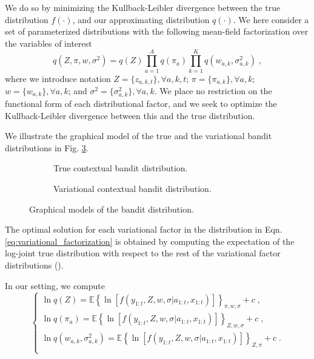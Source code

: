 \documentclass[10pt]{article}
\newcommand{\eValue}[1]{\mathbb{E}\left\{ #1 \right\}}
\begin{document}
We do so by minimizing the Kullback-Leibler divergence between the true distribution $f(\cdot)$, and our approximating distribution $q(\cdot)$. We 
here consider
a set of parameterized distributions with the following mean-field factorization over the variables of interest
\begin{equation}
q(Z, \pi, w, \sigma^2)=q(Z) \prod_{a=1}^A q(\pi_a) \prod_{k=1}^{K} q(w_{a,k}, \sigma_{a,k}^2) \; ,
\label{eq:variational_factorization}
\end{equation}
where we introduce notation 
  $Z=\{z_{a,k,t}\}, \forall a,k,t$; 
  $\pi=\{\pi_{a,k}\}, \forall a,k$; 
  $w=\{w_{a,k}\}, \forall a,k$; 
  and 
  $\sigma^2=\{\sigma_{a,k}^2\}, \forall a,k$. 
We place no restriction on the functional form of each distributional factor, and we seek to optimize the Kullback-Leibler divergence between this and the true distribution.

We illustrate the graphical model of the true and the variational bandit distributions in Fig. \ref{fig:graphical_bandit}.

\begin{figure}[h]
	\centering
	\begin{subfigure}[b]{0.49\textwidth}
		\begin{center}
			
		\end{center}
		\label{fig:true_bandit}
		\caption{True contextual bandit distribution.}
	\end{subfigure}
	\begin{subfigure}[b]{0.49\textwidth}	
		\begin{center}
			
		\end{center}
		\label{fig:variational_bandit}
		\caption{Variational contextual bandit distribution.}
	\end{subfigure}
	\caption{Graphical models of the bandit distribution.}
	\label{fig:graphical_bandit}
\end{figure}

The optimal solution for each variational factor in the distribution in Eqn. \ref{eq:variational_factorization} is obtained by computing the expectation of the log-joint true distribution with respect to the rest of the variational factor distributions (\cite{b-Bishop2006}).

In our setting, we compute
\begin{equation}
\begin{cases}
\ln q(Z) =\eValue{\ln\left[f(y_{1:t}, Z, w, \sigma|a_{1:t}, x_{1:t})\right]}_{\pi, w, \sigma}+c \;, \\
\ln q(\pi_a) =\eValue{\ln\left[f(y_{1:t}, Z, w, \sigma|a_{1:t}, x_{1:t})\right]}_{Z, w, \sigma}+c \;,\\
\ln q(w_{a,k},\sigma_{a,k}^2) =\eValue{\ln\left[f(y_{1:t}, Z, w, \sigma|a_{1:t}, x_{1:t})\right]}_{Z,\pi}+c \;.\\
\end{cases}
\end{equation}
\end{document}
